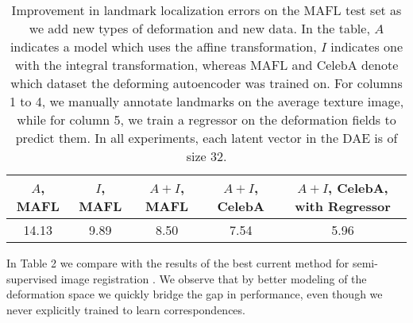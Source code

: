 \documentclass[runningheads]{llncs}
\begin{document}



\begin{table}[ht!]
 \centering
 \begin{tabular}{c | c | c | c | c }
      $A$, MAFL & $I$, MAFL & $A+I$, MAFL & $A+I$, CelebA & $A+I$, CelebA, with Regressor  \\
      \hline
      14.13 & 9.89 & 8.50 & 7.54 & 5.96\\
      \hline
 \end{tabular}
 \caption{Improvement in landmark localization errors on the MAFL test set as we add new types of deformation and new data. In the table, $A$ indicates a model which uses the affine transformation, $I$ indicates one with the integral transformation, whereas MAFL and CelebA denote which dataset the deforming autoencoder was trained on.  For columns 1 to 4, we manually annotate landmarks on the average texture image, while for column 5, we train a regressor on the deformation fields to predict them. In all experiments, each latent vector in the DAE is of size 32.}
 \label{tab:errDeforms}
 \vspace{-.5cm}
\end{table}



In Table 2 we compare with the results of the best current method for semi-supervised image registration \cite{ThewlisBV17a}. We observe that by better modeling of the deformation space we quickly bridge the gap in performance, even though we never explicitly trained to learn correspondences.
\end{document}
